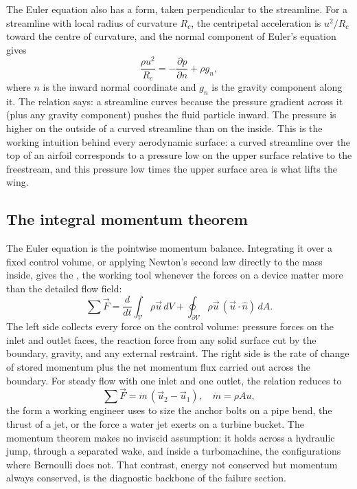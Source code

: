 The Euler equation also has a  form, taken
perpendicular to the streamline. For a streamline with local radius
of curvature $R_c$, the centripetal acceleration is $u^2/R_c$ toward
the centre of curvature, and the normal component of Euler's
equation gives
\[
\frac{\rho u^2}{R_c} = -\frac{\partial p}{\partial n}
+ \rho g_n,
\]
where $n$ is the inward normal coordinate and $g_n$ is the gravity
component along it. The relation says: a streamline curves because
the pressure gradient across it (plus any gravity component) pushes
the fluid particle inward. The pressure is higher on the outside
of a curved streamline than on the inside. This is the working
intuition behind every aerodynamic surface: a curved streamline
over the top of an airfoil corresponds to a pressure low on the
upper surface relative to the freestream, and this pressure low
times the upper surface area is what lifts the wing.

\subsection{The integral momentum theorem}

The Euler equation is the pointwise momentum balance. Integrating it
over a fixed control volume, or applying Newton's second law directly
to the mass inside, gives the ,
the working tool whenever the forces on a device matter more than the
detailed flow field:
\[
\sum \vec{F}
= \frac{d}{dt}\int_{\mathcal{V}} \rho\vec{u}\,dV
+ \oint_{\partial\mathcal{V}} \rho\vec{u}\,(\vec{u}\cdot\hat{n})\,dA.
\]
The left side collects every force on the control volume: pressure
forces on the inlet and outlet faces, the reaction force from any
solid surface cut by the boundary, gravity, and any external
restraint. The right side is the rate of change of stored momentum
plus the net momentum flux carried out across the boundary. For
steady flow with one inlet and one outlet, the relation reduces to
\[
\sum \vec{F} = \dot{m}\,(\vec{u}_2 - \vec{u}_1),
\quad \dot{m} = \rho A u,
\]
the form a working engineer uses to size the anchor bolts on a pipe
bend, the thrust of a jet, or the force a water jet exerts on a
turbine bucket. The momentum theorem makes no inviscid assumption: it
holds across a hydraulic jump, through a separated wake, and inside a
turbomachine, the configurations where Bernoulli does not. That
contrast, energy not conserved but momentum always conserved, is the
diagnostic backbone of the failure section.

